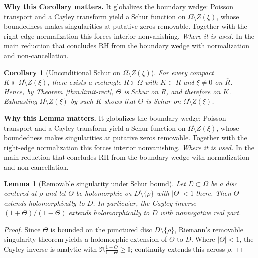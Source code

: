 \documentclass[11pt]{article}
\newtheorem{lemma}{Lemma}[section]
\newtheorem{corollary}{Corollary}[section]
\theoremstyle{definition}
\theoremstyle{remark}
\begin{document}
\vspace{1.0cm}
\noindent\textbf{Why this Corollary matters.} It globalizes the boundary wedge: Poisson transport and a Cayley transform yield a Schur function on $\Omega\setminus Z(\xi)$, whose boundedness makes singularities at putative zeros removable. Together with the right-edge normalization this forces interior nonvanishing.
\noindent\textit{Where it is used.} In the main reduction that concludes RH from the boundary wedge with normalization and non-cancellation.
\begin{corollary}[Unconditional Schur on \(\Omega\setminus Z(\xi)\)]\label{cor:Schur-off-zeros}
For every compact \(K\Subset \Omega\setminus Z(\xi)\), there exists a rectangle \(R\Subset\Omega\) with \(K\subset R\) and \(\xi\neq 0\) on \(\overline R\). Hence, by Theorem~\ref{thm:limit-rect}, \(\Theta\) is Schur on $R$, and therefore on $K$. Exhausting \(\Omega\setminus Z(\xi)\) by such \(K\) shows that \(\Theta\) is Schur on \(\Omega\setminus Z(\xi)\).
\end{corollary}




\vspace{1.0cm}
\noindent\textbf{Why this Lemma matters.} It globalizes the boundary wedge: Poisson transport and a Cayley transform yield a Schur function on $\Omega\setminus Z(\xi)$, whose boundedness makes singularities at putative zeros removable. Together with the right-edge normalization this forces interior nonvanishing.
\noindent\textit{Where it is used.} In the main reduction that concludes RH from the boundary wedge with normalization and non-cancellation.
\begin{lemma}[Removable singularity under Schur bound]
\label{lem:removable-schur}
Let $D\subset\Omega$ be a disc centered at $\rho$ and let $\Theta$ be holomorphic on $D\setminus\{\rho\}$ with $|\Theta|<1$ there. Then $\Theta$ extends holomorphically to $D$. In particular, the Cayley inverse $(1+\Theta)/(1-\Theta)$ extends holomorphically to $D$ with nonnegative real part.
\end{lemma}
\begin{proof}
Since $\Theta$ is bounded on the punctured disc $D\setminus\{\rho\}$, Riemann's removable singularity theorem yields a holomorphic extension of $\Theta$ to $D$. Where $|\Theta|<1$, the Cayley inverse is analytic with $\Re\tfrac{1+\Theta}{1-\Theta}\ge 0$; continuity extends this across $\rho$.
\end{proof}
\end{document}
